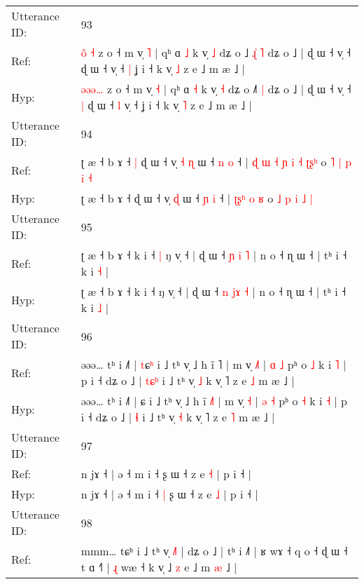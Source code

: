\documentclass[10pt]{article}
\DeclareRobustCommand{\hl}[1]{{\textcolor{red}{#1}}}
\begin{document}
\begin{longtable}{ll}
 \\
\midrule
Utterance ID: & 93 \\
Ref: & \hl{o}\hl{̃}\hl{ }\hl{˧} z o ˧ m v̩ \hl{˥} | qʰ ɑ \hl{˩} k v̩ \hl{˩} dʑ o ˩\hl{ }\hl{ɻ}\hl{̍} \hl{˥} dʑ o ˩ | ɖ ɯ ˧ v̩ ˧\hl{}\hl{} ɖ ɯ ˧\hl{}\hl{} v̩ ˧\hl{ }\hl{|} ʝ i ˧ k v̩ \hl{˩} z e ˩ m æ ˩ |
 \\
Hyp: & \hl{ə}\hl{ə}\hl{ə}\hl{…} z o ˧ m v̩ \hl{˧} | qʰ ɑ \hl{˧} k v̩ \hl{˧} dʑ o ˩\hl{}\hl{}\hl{˥} \hl{|} dʑ o ˩ | ɖ ɯ ˧ v̩ ˧\hl{ }\hl{|} ɖ ɯ ˧\hl{ }\hl{l} v̩ ˧\hl{}\hl{} ʝ i ˧ k v̩ \hl{˥} z e ˩ m æ ˩ |
 \\
\midrule
Utterance ID: & 94 \\
Ref: & ʈ æ ˧ b ɤ ˧\hl{ }\hl{|} ɖ ɯ ˧ v̩\hl{ }\hl{˧} \hl{ɳ} ɯ ˧ \hl{n} \hl{o} ˧ |\hl{ }\hl{ɖ}\hl{ }\hl{ɯ}\hl{ }\hl{˧} \hl{ɲ}\hl{ }\hl{i} \hl{˧} \hl{ʈ}\hl{ʂ}\hl{ʰ} o \hl{˥} \hl{|} \hl{p} \hl{i} \hl{˧}
 \\
Hyp: & ʈ æ ˧ b ɤ ˧\hl{}\hl{} ɖ ɯ ˧ v̩\hl{}\hl{} \hl{ɖ} ɯ ˧ \hl{ɲ} \hl{i} ˧ |\hl{}\hl{}\hl{}\hl{}\hl{}\hl{} \hl{ʈ}\hl{ʂ}\hl{ʰ} \hl{o} \hl{}\hl{}\hl{ʁ} o \hl{˩} \hl{p} \hl{i} \hl{˩} \hl{|}
 \\
\midrule
Utterance ID: & 95 \\
Ref: & ʈ æ ˧ b ɤ ˧ k i ˧\hl{ }\hl{|} ŋ v̩ ˧ | ɖ ɯ ˧ \hl{ɲ} \hl{}\hl{i} \hl{˥} | n o ˧ ɳ ɯ ˧ | tʰ i ˧ k i \hl{˧} |
 \\
Hyp: & ʈ æ ˧ b ɤ ˧ k i ˧\hl{}\hl{} ŋ v̩ ˧ | ɖ ɯ ˧ \hl{n} \hl{j}\hl{ɤ} \hl{˧} | n o ˧ ɳ ɯ ˧ | tʰ i ˧ k i \hl{˩} |
 \\
\midrule
Utterance ID: & 96 \\
Ref: & əəə… tʰ i ˩˥ | \hl{t}ɕ\hl{ʰ} i ˩ tʰ v̩ ˩ h ĩ \hl{}˥ | m v̩ \hl{˩}\hl{˥} | \hl{ɑ} \hl{˩} pʰ o \hl{˩} k i \hl{˥} | p i ˧ dʑ o ˩ | \hl{t}\hl{ɕ}\hl{ʰ} i ˩ tʰ v̩ \hl{˩} k v̩ ˥ z e \hl{˩} m æ ˩ |
 \\
Hyp: & əəə… tʰ i ˩˥ | \hl{}ɕ\hl{} i ˩ tʰ v̩ ˩ h ĩ \hl{˩}˥ | m v̩ \hl{}\hl{˧} | \hl{ə} \hl{˧} pʰ o \hl{˧} k i \hl{˧} | p i ˧ dʑ o ˩ | \hl{}\hl{}\hl{ɬ} i ˩ tʰ v̩ \hl{˧} k v̩ ˥ z e \hl{˥} m æ ˩ |
 \\
\midrule
Utterance ID: & 97 \\
Ref: & n jɤ ˧ | ə ˧ m i ˧\hl{}\hl{} ʂ ɯ ˧ z e \hl{˧} | p i ˧ |
 \\
Hyp: & n jɤ ˧ | ə ˧ m i ˧\hl{ }\hl{|} ʂ ɯ ˧ z e \hl{˩} | p i ˧ |
 \\
\midrule
Utterance ID: & 98 \\
Ref: & mmm… tɕʰ i ˩ tʰ v̩ \hl{˩}˥ | dʑ o ˩ | tʰ i ˩˥ | ʁ wɤ ˧ q o ˧ ɖ ɯ ˧ t ɑ ˧˥ | \hl{ɻ} wæ ˧ k v̩ ˩ \hl{}\hl{z} e ˩ m \hl{}\hl{æ} ˩ |
 \\

\end{longtable}
\end{document}
